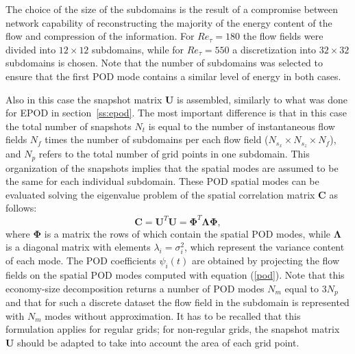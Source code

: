 The choice of the size of the subdomains is the result of a compromise between network capability of reconstructing the majority of the energy content of the flow and compression of the information.
For $Re_{\tau}=180$ the flow fields were divided into $12\times12$ subdomains, while for $Re_{\tau}=550$ a discretization into $32\times32$ subdomains is chosen.
Note that the number of subdomains was selected to ensure that the first POD mode contains a similar level of energy in both cases.

Also in this case the snapshot matrix $\mathbf{U}$ is assembled, similarly to what was done for EPOD in section~\ref{ss:epod}.
The most important difference is that in this case the total number of snapshots $N_t$ is equal to the number of instantaneous flow fields $N_f$ times the number of subdomains per each flow field ($N_{s_x}\times N_{s_z}\times N_f$), and $N_p$ refers to the total number of grid points in one subdomain.
This organization of the snapshots implies that the spatial modes are assumed to be the same for each individual subdomain.
These POD spatial modes can be evaluated solving the eigenvalue problem of the spatial correlation matrix $\mathbf{C}$ as follows:
\begin{equation}
    \mathbf{C}=\mathbf{U}^T\mathbf{U}=\boldsymbol{\Phi}^T\boldsymbol{\Lambda}\boldsymbol{\Phi},
    \label{pod}
\end{equation}
\noindent where $\boldsymbol{\Phi}$ is a matrix the rows of which contain the spatial POD modes, while $\boldsymbol{\Lambda}$ is a diagonal matrix with elements $\lambda_i=\sigma_i^2$, which represent the variance content of each mode.
The POD coefficients $\psi_i(t)$ are obtained by projecting the flow fields on the spatial POD modes computed with equation (\ref{pod}).
Note that this economy-size decomposition returns a number of POD modes $N_m$ equal to $3N_p$ and that for such a discrete dataset the flow field in the subdomain is represented with $N_m$ modes without approximation.
It has to be recalled that this formulation applies for regular grids; for non-regular grids, the snapshot matrix $\mathbf{U}$ should be adapted to take into account the area of each grid point.

